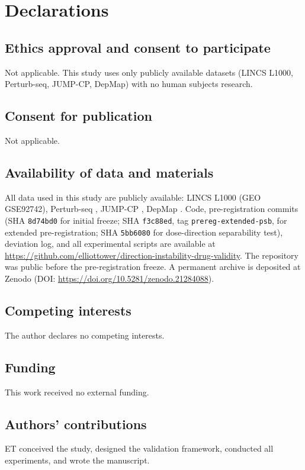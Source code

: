 \documentclass[11pt]{article}
\begin{document}
\section*{Declarations}

\subsection*{Ethics approval and consent to participate}
Not applicable. This study uses only publicly available datasets
(LINCS L1000, Perturb-seq, JUMP-CP, DepMap) with no human subjects
research.

\subsection*{Consent for publication}
Not applicable.

\subsection*{Availability of data and materials}
All data used in this study are publicly available: LINCS L1000
(GEO GSE92742), Perturb-seq \citep{replogle2022mapping}, JUMP-CP
\citep{chandrasekaran2023jump}, DepMap \citep{dempster2021chronos}.
Code, pre-registration commits (SHA \texttt{8d74bd0} for initial
freeze; SHA \texttt{f3c88ed}, tag \texttt{prereg-extended-psb}, for
extended pre-registration; SHA \texttt{5bb6080} for dose-direction
separability test), deviation log, and all experimental scripts are
available at
\url{https://github.com/elliottower/direction-instability-drug-validity}.
The repository was public before the pre-registration freeze.
A permanent archive is deposited at Zenodo
(DOI: \url{https://doi.org/10.5281/zenodo.21284088}).

\subsection*{Competing interests}
The author declares no competing interests.

\subsection*{Funding}
This work received no external funding.

\subsection*{Authors' contributions}
ET conceived the study, designed the validation framework, conducted
all experiments, and wrote the manuscript.
\end{document}
